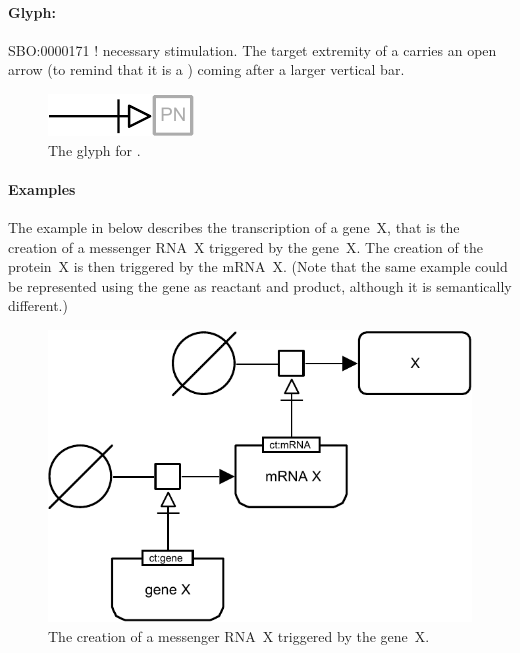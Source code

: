\paragraph{Glyph: }\label{sec:techref:necessary_stim}


\begin{glyphDescription}
 \glyphSboTerm SBO:0000171 ! necessary stimulation.
 \glyphNode The target extremity of a  carries an open arrow (to remind that it is a ) coming after a larger vertical bar.
 \end{glyphDescription}

\begin{figure}[htb]
  \centering
  \includegraphics[scale = 0.5]{images/necessary_stim}
  \caption{The \PD glyph for .}
  \label{fig:techref:Necessary Stimulation}
\end{figure}

\paragraph{Examples}

The example in  below describes the
transcription of a gene~X, that is the creation of a messenger RNA~X
triggered by the gene~X.  The creation of the protein~X is then
triggered by the mRNA~X.  (Note that the same example could be
represented using the gene as reactant and product, although it is
semantically different.)

\begin{figure}[htb]
  \centering
  \includegraphics[scale = 0.4]{examples/necessary_stim-genetic}
  \caption{The creation of a messenger RNA~X triggered by the gene~X.}
  \label{fig:techref:necessary_stim-gene}
\end{figure}


